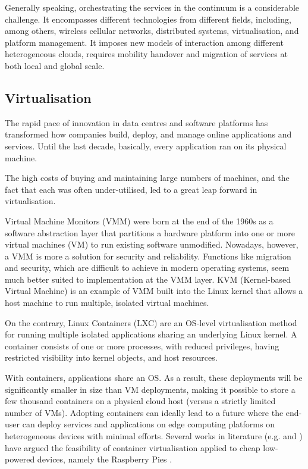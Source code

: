 Generally speaking, orchestrating the services in the continuum is a considerable challenge. It encompasses different technologies from different fields, including, among others, wireless cellular networks, distributed systems, virtualisation, and platform management. It imposes new models of interaction among different heterogeneous clouds, requires mobility handover and migration of services at both local and global scale.

\subsection{Virtualisation}
\label{sec:virtualisation}

The rapid pace of innovation in data centres and software platforms has transformed how companies build, deploy, and manage online applications and services. Until the last decade, basically, every application ran on its physical machine.

The high costs of buying and maintaining large numbers of machines, and the fact that each was often under-utilised, led to a great leap forward in virtualisation.

Virtual Machine Monitors (VMM) \cite{rosenblum2005virtual} were born at the end of the 1960s as a software abstraction layer that partitions a hardware platform into one or more virtual machines (VM) to run existing software unmodified. Nowadays, however, a VMM is more a solution for security and reliability. Functions like migration and security, which are difficult to achieve in modern operating systems, seem much better suited to implementation at the VMM layer. KVM (Kernel-based Virtual Machine) \cite{kvm} is an example of VMM built into the Linux kernel that allows a host machine to run multiple, isolated virtual machines. 

On the contrary, Linux Containers (LXC) \cite{bernstein2014containers} are an OS-level virtualisation method for running multiple isolated applications sharing an underlying Linux kernel. A container consists of one or more processes, with reduced privileges, having restricted visibility into kernel objects, and host resources.

With containers, applications share an OS. As a result, these deployments will be significantly smaller in size than VM deployments, making it possible to store a few thousand containers on a physical cloud host (versus a strictly limited number of VMs). Adopting containers can ideally lead to a future where the end-user can deploy services and applications on edge computing platforms on heterogeneous devices with minimal efforts. Several works in literature (e.g. \cite{pahl2016container} and \cite{bellavista2017feasibility}) have argued the feasibility of container virtualisation applied to cheap low-powered devices, namely the Raspberry Pies \cite{raspberry}.

